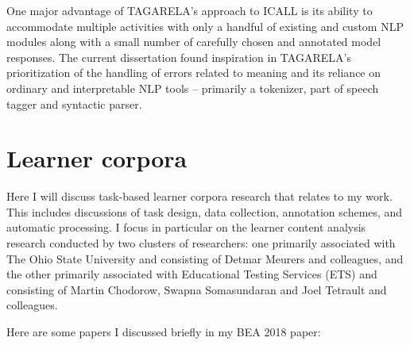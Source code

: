 One major advantage of TAGARELA's approach to ICALL is its ability to accommodate multiple activities with only a handful of existing and custom NLP modules along with a small number of carefully chosen and annotated model responses. The current dissertation found inspiration in TAGARELA's prioritization of the handling of errors related to meaning and its reliance on ordinary and interpretable NLP tools -- primarily a tokenizer, part of speech tagger and syntactic parser. 

\section{Learner corpora}
\label{section:learnerCorpora}
Here I will discuss task-based learner corpora research that relates to my work. This includes discussions of task design, data collection, annotation schemes, and automatic processing. I focus in particular on the learner content analysis research conducted by two clusters of researchers: one primarily associated with The Ohio State University and consisting of Detmar Meurers and colleagues, and the other primarily associated with Educational Testing Services (ETS) and consisting of Martin Chodorow, Swapna Somasundaran and Joel Tetrault and colleagues. 

Here are some papers I discussed briefly in my BEA 2018 paper:

\cite{leacock:ea:14}

\cite{kyle2015automatically}

\cite{weigle2013english}

\cite{amaral:meurers:user:07}

\cite{Meurers.Dickinson-17}

\cite{heift:schulze:07}

\cite{somasundaran:ea:15}

\cite{bailey:meurers:08}

\cite{meurers2011evaluating}

\cite{somasundaran:chodorow:14}

\cite{cahill-et-al:14}

\cite{ragheb:dickinson:14a}

\cite{foster2009native}

\cite{cho2013investigating}

\cite{landis1977measurement}

\cite{artstein:massimo:2008}

\cite{tetreault-chodorow:2008:HJCL}

